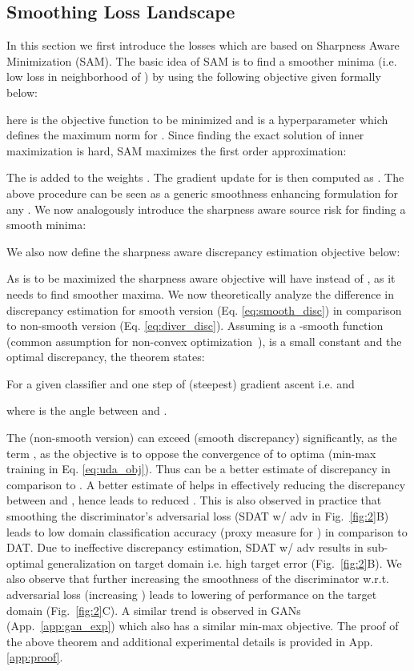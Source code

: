 \documentclass[table,dvipsnames]{article}
\theoremstyle{plain}
\theoremstyle{definition}
\theoremstyle{remark}
\begin{document}
\subsection{Smoothing Loss Landscape}
\label{sec:subopt_dis}
In this section we first introduce the losses which are based on Sharpness Aware Minimization \citep{foret2021sharpnessaware} (SAM). The basic idea of SAM is to find a smoother minima (i.e. low loss in  neighborhood of ) by using the following objective given formally below:

here  is the objective function to be minimized and  is a hyperparameter which defines the maximum norm for . Since finding the exact solution of inner maximization is hard, SAM maximizes the first order approximation:



The  is added to the weights . The gradient update for  is then computed as . The above procedure can be seen as a generic smoothness enhancing formulation for any . We now analogously introduce the sharpness aware source risk for finding a smooth minima:

We also now define the sharpness aware discrepancy estimation objective below:

As  is to be maximized the sharpness aware objective will have  instead of , as it needs to find smoother maxima. We now theoretically analyze the difference in discrepancy estimation for smooth version  (Eq. \ref{eq:smooth_disc}) in comparison to non-smooth version  (Eq. \ref{eq:diver_disc}). Assuming  is a -smooth function {(common assumption for non-convex optimization~\citep{carmon2020lower})}, 
 is a small constant and  the optimal discrepancy, the theorem states:

\begin{theorem}
\label{th:suboptimality}
For a given classifier  and one step of (steepest) gradient ascent i.e.  and  

where  is the angle between  and . 
\end{theorem}

The  (non-smooth version) can exceed  (smooth discrepancy) significantly, as the term , as the  objective is to oppose the convergence of  to optima  (min-max training in Eq. \ref{eq:uda_obj}). Thus  can be a better estimate of discrepancy in comparison to . A better estimate of  helps in effectively reducing the discrepancy between  and , hence leads to reduced . This is also observed in practice that smoothing the discriminator's adversarial loss (SDAT w/ adv in Fig.\ \ref{fig:2}\textcolor{mydarkblue}{B}) leads to low domain classification accuracy (proxy measure for ) in comparison to DAT. 
Due to ineffective discrepancy estimation, SDAT w/ adv results in sub-optimal generalization on target domain i.e. high target error  (Fig.\ \ref{fig:2}\textcolor{mydarkblue}{B}). We also observe that further increasing the smoothness of the discriminator w.r.t. adversarial loss (increasing ) leads to lowering of performance on the target domain (Fig.\ \ref{fig:2}\textcolor{mydarkblue}{C}). A similar trend is observed in GANs (App.\ \ref{app:gan_exp}) which also has a similar min-max objective. The proof of the above theorem and additional experimental details is provided in App. \ref{app:proof}.
\end{document}
